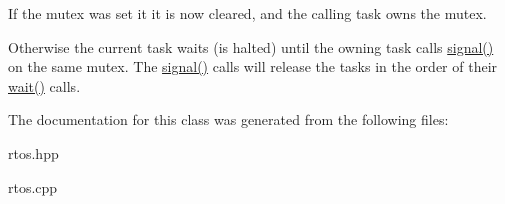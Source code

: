 If the mutex was set it it is now cleared, and the calling task owns the mutex.

Otherwise the current task waits (is halted) until the owning task calls \hyperlink{classrtos_1_1mutex_ad57303013f03da5856e54f331323dc5d}{signal()} on the same mutex. The \hyperlink{classrtos_1_1mutex_ad57303013f03da5856e54f331323dc5d}{signal()} calls will release the tasks in the order of their \hyperlink{classrtos_1_1mutex_af005eb2964192bbdf1a444eab11eb683}{wait()} calls. 

The documentation for this class was generated from the following files\+:\begin{DoxyCompactItemize}
\item 
rtos.\+hpp\item 
rtos.\+cpp\end{DoxyCompactItemize}
